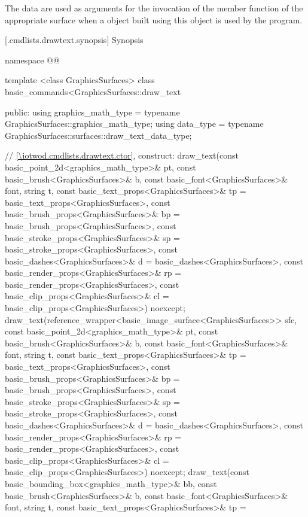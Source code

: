 \pnum
The data are used as arguments for the invocation of the  member function of the appropriate surface when a  object built using this  object is used by the program.

 [\iotwod.cmdlists.drawtext.synopsis] {Synopsis}
\begin{codeblock}
namespace @\fullnamespace{}@ {
  template <class GraphicsSurfaces>
  class basic_commands<GraphicsSurfaces::draw_text {
  public:
    using graphics_math_type = typename GraphicsSurfaces::graphics_math_type;
    using data_type = typename GraphicsSurfaces::surfaces::draw_text_data_type;

    // \ref{\iotwod.cmdlists.drawtext.ctor}, construct:
    draw_text(const basic_point_2d<graphics_math_type>& pt,
      const basic_brush<GraphicsSurfaces>& b,
      const basic_font<GraphicsSurfaces>& font, string t,
      const basic_text_props<GraphicsSurfaces>& tp = 
      basic_text_props<GraphicsSurfaces>{},
      const basic_brush_props<GraphicsSurfaces>& bp = 
      basic_brush_props<GraphicsSurfaces>{},
      const basic_stroke_props<GraphicsSurfaces>& sp = 
      basic_stroke_props<GraphicsSurfaces>{},
      const basic_dashes<GraphicsSurfaces>& d =
      basic_dashes<GraphicsSurfaces>{},
      const basic_render_props<GraphicsSurfaces>& rp = 
      basic_render_props<GraphicsSurfaces>{},
      const basic_clip_props<GraphicsSurfaces>& cl = 
      basic_clip_props<GraphicsSurfaces>{}) noexcept;
    draw_text(reference_wrapper<basic_image_surface<GraphicsSurfaces>> sfc,
      const basic_point_2d<graphics_math_type>& pt,
      const basic_brush<GraphicsSurfaces>& b,
      const basic_font<GraphicsSurfaces>& font, string t,
      const basic_text_props<GraphicsSurfaces>& tp = 
      basic_text_props<GraphicsSurfaces>{},
      const basic_brush_props<GraphicsSurfaces>& bp = 
      basic_brush_props<GraphicsSurfaces>{},
      const basic_stroke_props<GraphicsSurfaces>& sp = 
      basic_stroke_props<GraphicsSurfaces>{},
      const basic_dashes<GraphicsSurfaces>& d =
      basic_dashes<GraphicsSurfaces>{},
      const basic_render_props<GraphicsSurfaces>& rp = 
      basic_render_props<GraphicsSurfaces>{},
      const basic_clip_props<GraphicsSurfaces>& cl = 
      basic_clip_props<GraphicsSurfaces>{}) noexcept;
    draw_text(const basic_bounding_box<graphics_math_type>& bb,
      const basic_brush<GraphicsSurfaces>& b,
      const basic_font<GraphicsSurfaces>& font, string t,
      const basic_text_props<GraphicsSurfaces>& tp = 
}}
\end{codeblock}
